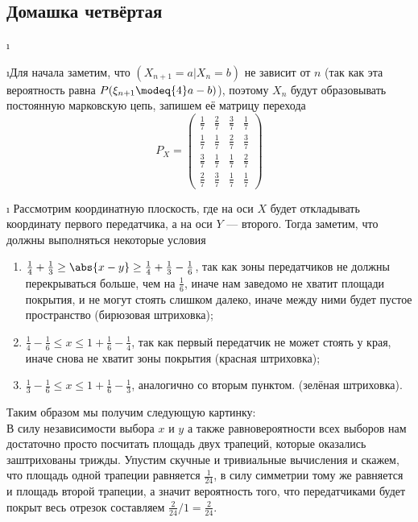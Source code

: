 \subsection{Домашка четвёртая}


\i 


\i Для начала заметим, что $(X_{n+1} = a | X_n = b)$ не зависит от $n$ (так как эта вероятность равна $P(\xi_{n+1} \modeq{4} a - b)$), поэтому $X_n$ будут
образовывать постоянную марковскую цепь, запишем её матрицу перехода 
    \[P_X = \begin{pmatrix}
        \frac{1}{7} & \frac{2}{7} & \frac{3}{7} & \frac{1}{7} \\ 
        \frac{1}{7} & \frac{1}{7} & \frac{2}{7} & \frac{3}{7} \\ 
        \frac{3}{7} & \frac{1}{7} & \frac{1}{7} & \frac{2}{7} \\ 
        \frac{2}{7} & \frac{3}{7} & \frac{1}{7} & \frac{1}{7}
    \end{pmatrix}\]


\i 
Рассмотрим координатную плоскость, где на оси $X$ будет откладывать координату первого передатчика, а на оси $Y$ --- второго. Тогда заметим, что должны выполняться
некоторые условия 
\begin{enumerate}
    \item $\frac{1}{4} + \frac{1}{3} \geq \abs{x - y} \geq \frac{1}{4} + \frac{1}{3} - \frac{1}{6}$, так как зоны передатчиков не должны перекрываться больше, чем на $\frac{1}{6}$, иначе 
        нам заведомо не хватит площади покрытия, и не могут стоять слишком далеко, иначе между ними будет пустое пространство (бирюзовая штриховка);
    \item $\frac{1}{4} - \frac{1}{6} \leq x \leq 1 + \frac{1}{6} - \frac{1}{4}$, так как первый передатчик не может стоять у края, иначе снова не хватит зоны покрытия
        (красная штриховка);
    \item $\frac{1}{3} - \frac{1}{6} \leq x \leq 1 + \frac{1}{6} - \frac{1}{3}$, аналогично со вторым пунктом. (зелёная штриховка).
\end{enumerate}
Таким образом мы получим следующую картинку:
\\
В силу независимости выбора $x$ и $y$ а также равновероятности всех выборов нам достаточно просто посчитать площадь двух трапеций, которые оказались заштрихованы 
трижды. Упустим скучные и тривиальные вычисления и скажем, что площадь одной трапеции равняется $\frac{1}{24}$, в силу симметрии тому же равняется и площадь 
второй трапеции, а значит вероятность того, что передатчиками будет покрыт весь отрезок составляем $\frac{2}{24} / 1 = \frac{2}{24}$.